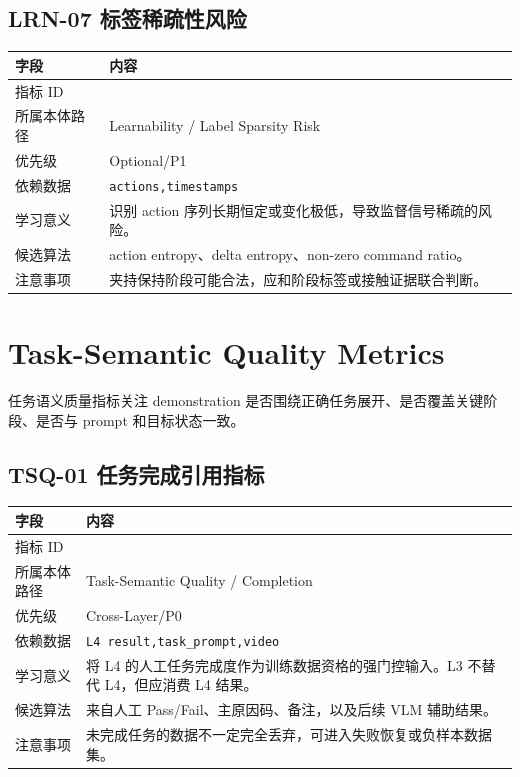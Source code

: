 \documentclass[UTF8,zihao=-4,oneside,openany]{ctexrep}
\newcommand{\Code}[1]{\texttt{#1}}
\newcommand{\MID}[1]{\texttt{\seqsplit{#1}}}
\begin{document}
\subsection{LRN-07 标签稀疏性风险}

\begin{longtable}{L{3.6cm} L{9.6cm}}
\toprule
字段 & 内容 \\
\midrule
指标 ID & \MID{LRN-07} \\
所属本体路径 & Learnability / Label Sparsity Risk \\
优先级 & Optional/P1 \\
依赖数据 & \Code{actions,timestamps} \\
学习意义 & 识别 action 序列长期恒定或变化极低，导致监督信号稀疏的风险。 \\
候选算法 & action entropy、delta entropy、non-zero command ratio。 \\
注意事项 & 夹持保持阶段可能合法，应和阶段标签或接触证据联合判断。 \\
\bottomrule
\end{longtable}

\section{Task-Semantic Quality Metrics}

任务语义质量指标关注 demonstration 是否围绕正确任务展开、是否覆盖关键阶段、是否与 prompt 和目标状态一致。


\subsection{TSQ-01 任务完成引用指标}

\begin{longtable}{L{3.6cm} L{9.6cm}}
\toprule
字段 & 内容 \\
\midrule
指标 ID & \MID{TSQ-01} \\
所属本体路径 & Task-Semantic Quality / Completion \\
优先级 & Cross-Layer/P0 \\
依赖数据 & \Code{L4 result,task\_prompt,video} \\
学习意义 & 将 L4 的人工任务完成度作为训练数据资格的强门控输入。L3 不替代 L4，但应消费 L4 结果。 \\
候选算法 & 来自人工 Pass/Fail、主原因码、备注，以及后续 VLM 辅助结果。 \\
注意事项 & 未完成任务的数据不一定完全丢弃，可进入失败恢复或负样本数据集。 \\
\bottomrule
\end{longtable}
\end{document}
